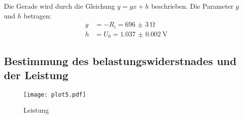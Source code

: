 Die Gerade wird durch die Gleichung $y = gx + h$ beschrieben. Die Parameter $g$ und $h$ betragen:
\begin{align*}
  g &= -R_i = \SI{696(3)}{\ohm}   \\
  h &= U_0 = \SI{1.037(2)}{\volt}
\end{align*}




\subsection{Bestimmung des belastungswiderstnades und der Leistung}
\begin{figure}[H]
  \centering
  \texttt{[image: plot5.pdf]}
  \caption{Leistung}
  \label{fig:plot5}
\end{figure}
